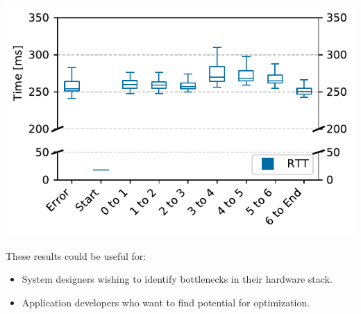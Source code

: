 \documentclass[portrait, a1]{KTHEEposter}
\begin{document}
\begin{pcolumns}[3]
\begin{pcolumn}[2]
\begin{pframe}[1.55]
\begin{center}
                \includegraphics[width=\linewidth]{plots/comparison/box_taskstep.pdf}
                \medskip
            \end{center}

            These results could be useful for:
            \begin{itemize}
                \item System designers wishing to identify bottlenecks in their hardware stack.
                \item Application developers who want to find potential for optimization.
            \end{itemize}
        \end{pframe}
        \begin{pframe**}[.45]
            \nocite{*}
            \footnotesize
            \printbibliography
        \end{pframe**}
    \end{pcolumn}
\end{pcolumns}
\end{document}
